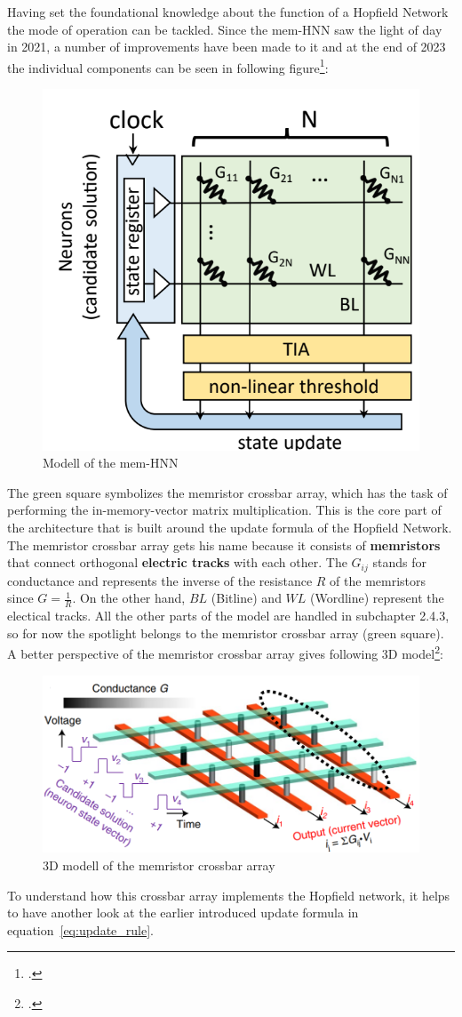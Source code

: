 Having set the foundational knowledge about the function of a Hopfield Network the mode of operation can be tackled. 
Since the \ac{mem-HNN} saw the light of day in 2021, a number of improvements have been made to it and at the end of 2023 the individual components can be seen in following figure\footcite[cf.][2]{hizzaniMemristorbasedHardwareAlgorithms2023}:
\begin{figure}[H]
    \centering
    \includegraphics[width=0.3\linewidth]{graphics/Mem_HNN_Modell.png}
    \caption{Modell of the mem-HNN}
    \label{ModellHMM}
\end{figure}
The green square symbolizes the memristor crossbar array, which has the task of performing the in-memory-vector matrix multiplication. 
This is the core part of the architecture that is built around the update formula of the Hopfield Network. 
The memristor crossbar array gets his name because it consists of \textbf{memristors} that connect orthogonal \textbf{electric tracks} with each other.
The \( G_{ij} \) stands for conductance and represents the inverse of the resistance \( R \) of the memristors since \( G = \frac{1}{R}\). On the other hand, \( BL \) (Bitline) and \( WL \) (Wordline) represent the electical tracks.
All the other parts of the model are handled in subchapter 2.4.3, so for now the spotlight belongs to the memristor crossbar array (green square).
A better perspective of the memristor crossbar array gives following 3D model\footcite[cf.][410]{caiPowerefficientCombinatorialOptimization2020}:
\begin{figure}[H]
    \centering
    \includegraphics[width=0.65\linewidth]{graphics/memristor_crossbar_array.png}
    \caption{3D modell of the memristor crossbar array}
\end{figure}
To understand how this crossbar array implements the Hopfield network, it helps to have another look at the earlier introduced update formula in equation~\ref{eq:update_rule}.


